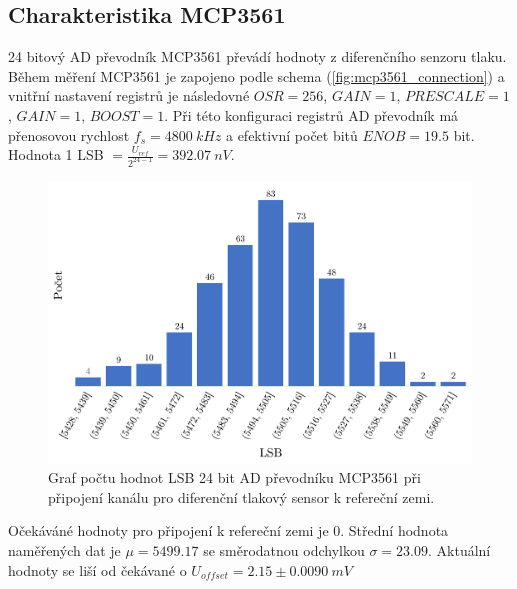 \subsection{Charakteristika MCP3561} \label{section:char_mcp}
24 bitový AD převodník MCP3561 převádí hodnoty z diferenčního senzoru tlaku. Během měření MCP3561 je zapojeno podle schema (\ref{fig:mcp3561_connection}) a vnitřní nastavení registrů je následovné $OSR = 256$, $GAIN = 1$, $PRESCALE = 1$, $GAIN = 1$, $BOOST = 1$.
Při této konfiguraci registrů AD převodník má přenosovou rychlost $f_s = 4800 \ kHz$ a efektivní počet bitů $ENOB = 19.5$ bit. Hodnota 1 LSB $= \frac{U_{ref}}{2^{24 - 1}} = 392.07 \ nV$.
\begin{figure}[H]
    \caption{Graf počtu hodnot LSB 24 bit AD převodníku MCP3561 při připojení kanálu
        pro diferenční tlakový sensor k refereční zemi.}
    \includegraphics[width=1\textwidth]{graphs/mcp_gnd.png}
\end{figure}
Očekáváné hodnoty pro připojení k refereční zemi je 0. Střední hodnota naměřených dat je $\mu = 5499.17$ se směrodatnou odchylkou $\sigma = 23.09$. Aktuální hodnoty se liší od čekávané o $U_{offset} = 2.15 \pm 0.0090 \ mV$

